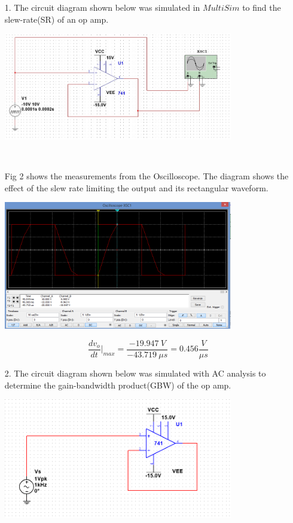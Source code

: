 \documentclass[11pt,a4paper]{article}
\begin{document}
\begin{enumerate}
  \item[1.]
  The circuit diagram shown below was simulated in $MultiSim$ to find the slew-rate(SR) of an op amp.\\
    \begin{minipage}{\linewidth}
      \centering       
       \includegraphics[width=10cm]{Task1-1Circuit}\\
    \end{minipage}\\
\pagebreak
\pagebreak

Fig 2 shows the measurements from the Oscilloscope. The diagram shows the effect of the slew rate limiting the output and its rectangular waveform.\\
	
    \begin{minipage}{\linewidth}
      \centering       
       \includegraphics[width=10cm]{Task1-1-Oscilloscope}\\
    \end{minipage}
$$ \dfrac{dv_{o}}{dt}|_{max} = \dfrac{-19.947 \ V}{-43.719\ \mu s} = 0.456 \frac{V}{\mu s} $$
  \item[2.]
  The circuit diagram shown below was simulated with AC analysis to determine the gain-bandwidth product(GBW) of the op amp.  
  
      \begin{minipage}{\linewidth}
      \centering
        \includegraphics[width=10cm]{Task1-2-Circuit}\\
    \end{minipage}
    

\end{enumerate}
\end{document}
